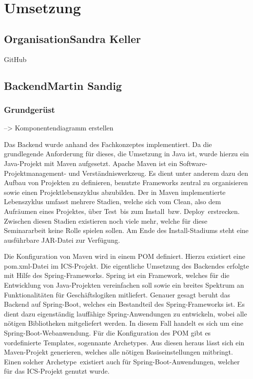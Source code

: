 \chapter{Umsetzung} \label{umsetzung}
	\section[Organisation]{Organisation{\hfill \normalsize Sandra Keller}}
	GitHub
	\section[Backend]{Backend{\hfill \normalsize Martin Sandig}}
\subsection{Grundgerüst}\label{umsetzung:backend:grundgeruest}
--> Komponentendiagramm erstellen

Das Backend wurde anhand des Fachkonzeptes implementiert. Da die grundlegende Anforderung für dieses, die Umsetzung in Java ist, wurde hierzu ein Java-Projekt mit Maven aufgesetzt. Apache Maven ist ein Software-Projektmanagement- und Verständniswerkzeug.\autocite{ApacheSoftwareFoundation} Es dient unter anderem dazu den Aufbau von Projekten zu definieren, benutzte Frameworks zentral zu organisieren sowie einen Projektlebenszyklus abzubilden. Der in Maven implementierte Lebenszyklus umfasst mehrere Stadien, welche sich vom \glqq Clean\grqq, also dem Aufräumen eines Projektes, über \glqq Test\grqq \, bis zum \glqq Install\grqq \, bzw. \glqq Deploy\grqq \, erstrecken. Zwischen diesen Stadien existieren noch viele mehr, welche für diese Seminararbeit keine Rolle spielen sollen. Am Ende des \glqq Install\grqq -Stadiums steht eine ausführbare JAR-Datei zur Verfügung.

Die Konfiguration von Maven wird in einem \ac{POM} definiert. Hierzu existiert eine \glqq pom.xml\grqq-Datei im \ac{ICS}-Projekt. Die eigentliche Umsetzung des Backendes erfolgte mit Hilfe des \glqq Spring\grqq -Frameworks. Spring ist ein Framework, welches für die Entwicklung von Java-Projekten vereinfachen soll sowie ein breites Spektrum an Funktionalitäten für Geschäftslogiken mitliefert.  Genauer gesagt beruht das Backend auf \glqq Spring-Boot\grqq, welches ein Bestandteil des Spring-Frameworks ist. Es dient dazu eigenständig lauffähige Spring-Anwendungen zu entwickeln, wobei alle nötigen Bibliotheken mitgeliefert werden.\autocite{PivotalSoftwareInc} In diesem Fall handelt es sich um eine Spring-Boot-Webanwendung. Für die Konfiguration des \ac{POM} gibt es vordefinierte Templates, sogennante \glqq Archetypes\grqq. Aus diesen heraus lässt sich ein Maven-Projekt generieren, welches alle nötigen Basiseinstellungen mitbringt. Einen solcher \glqq Archetype\grqq \, existiert auch für Spring-Boot-Anwendungen, welcher für das \ac{ICS}-Projekt genutzt wurde.

